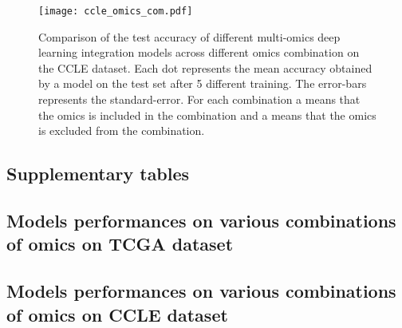 	\begin{figure}[htbp]
	    \centering
	    \texttt{[image: ccle\_omics\_com.pdf]}
	    \caption{Comparison of the test accuracy of different multi-omics deep learning integration models across different omics combination on the CCLE dataset. Each dot represents the mean accuracy obtained by a model on the test set after 5 different training. The error-bars represents the standard-error. For each combination a \cmark means that the omics is included in the combination and a \xmark means that the omics is excluded from the combination.}\label{fig:ccle_perf_comb}
	\end{figure}

	\begin{landscape}
	    \section{Supplementary tables}
		    \subsection{Models performances on various combinations of omics on TCGA dataset}
		        
		        
		        
		        
		        
		        
		        
		        
		        
		        
		        
		    \subsection{Models performances on various combinations of omics on CCLE dataset}
		        
		        
		        
		        
		        
		        
		        
		        
	\end{landscape}